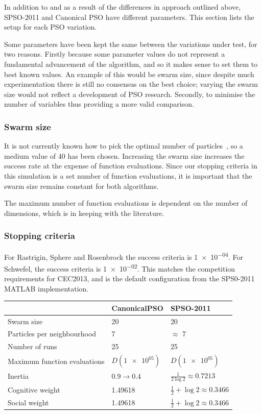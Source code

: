 \documentclass{csfourzero}
\begin{document}
In addition to and as a result of the differences in approach outlined above,
SPSO-2011 and Canonical PSO have different parameters.  This section lists the
setup for each PSO variation.

Some parameters have been kept the same between the variations under test, for
two reasons. Firstly because some parameter values do not represent a
fundamental advancement of the algorithm, and so it makes sense to set them to
best known values. An example of this would be swarm size, since despite much
experimentation there is still no consensus on the best choice; varying the
swarm size would not reflect a development of PSO research. Secondly, to
minimise the number of variables thus providing a more valid comparison.

\subsubsection{Swarm size}

It is not currently known how to pick the optimal number of
particles~\cite{Trelea:2003dv}, so a medium value of 40 has been chosen.
Increasing the swarm size increases the success rate at the expense of function
evaluations. Since our stopping criteria in this simulation is a set number of
function evaluations, it is important that the swarm size remains constant for
both algorithms.

The maximum number of function evaluations is dependent on the number of
dimensions, which is in keeping with the literature.

\subsubsection{Stopping criteria}

For Rastrigin, Sphere and Rosenbrock the success criteria is \num{1e-04}. For
Schwefel, the success criteria is \num{1e-02}. This matches the competition
requirements for CEC2013, and is the default configuration from the SPS0-2011
MATLAB implementation.

\begin{table}
  \begin{tabular}{lll}
  \hline
  ~                            & CanonicalPSO          & SPSO-2011 \\ \hline
  Swarm size                   & 20                    & 20 \\
  Particles per neighbourhood  & 7                     & $\approx$ 7 \\
  Number of runs               & 25                    & 25 \\
  Maximum function evaluations & $D(\num{1e+05})$      & $D(\num{1e+05})$ \\
  Inertia                      & $0.9 \rightarrow 0.4$ & $\frac{1}{2\log{2}} \approx 0.7213$ \\
  Cognitive weight             & 1.49618               & $\frac{1}{2} + \log{2} \approx 0.3466$ \\
  Social weight                & 1.49618               & $\frac{1}{2} + \log{2} \approx 0.3466$ \\
  \end{tabular}
\end{table}
\end{document}
